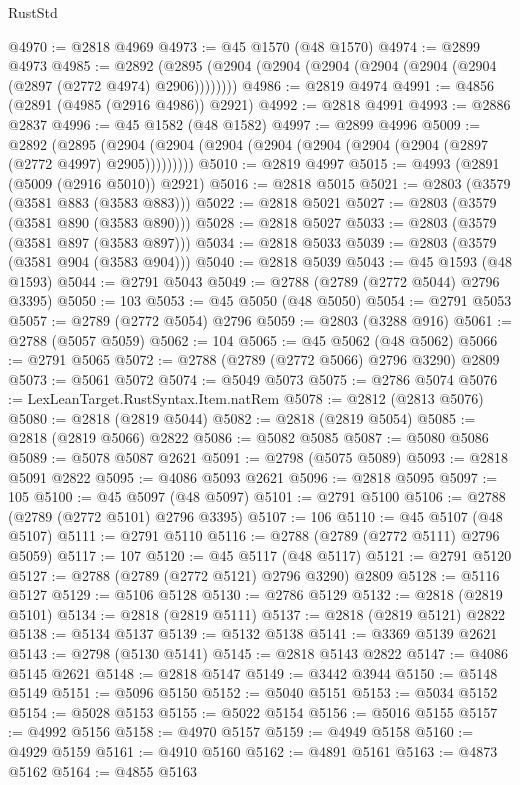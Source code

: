 \begin{lexlean}{RustStd}
\begin{coremodule}
@4970 := @2818 @4969
@4973 := @45 @1570 (@48 @1570)
@4974 := @2899 @4973
@4985 := @2892 (@2895 (@2904 (@2904 (@2904 (@2904 (@2904 (@2904 (@2897 (@2772 @4974) @2906))))))))
@4986 := @2819 @4974
@4991 := @4856 (@2891 (@4985 (@2916 @4986)) @2921)
@4992 := @2818 @4991
@4993 := @2886 @2837
@4996 := @45 @1582 (@48 @1582)
@4997 := @2899 @4996
@5009 := @2892
    (@2895 (@2904 (@2904 (@2904 (@2904 (@2904 (@2904 (@2904 (@2897 (@2772 @4997) @2905)))))))))
@5010 := @2819 @4997
@5015 := @4993 (@2891 (@5009 (@2916 @5010)) @2921)
@5016 := @2818 @5015
@5021 := @2803 (@3579 (@3581 @883 (@3583 @883)))
@5022 := @2818 @5021
@5027 := @2803 (@3579 (@3581 @890 (@3583 @890)))
@5028 := @2818 @5027
@5033 := @2803 (@3579 (@3581 @897 (@3583 @897)))
@5034 := @2818 @5033
@5039 := @2803 (@3579 (@3581 @904 (@3583 @904)))
@5040 := @2818 @5039
@5043 := @45 @1593 (@48 @1593)
@5044 := @2791 @5043
@5049 := @2788 (@2789 (@2772 @5044) @2796 @3395)
@5050 := 103
@5053 := @45 @5050 (@48 @5050)
@5054 := @2791 @5053
@5057 := @2789 (@2772 @5054) @2796
@5059 := @2803 (@3288 @916)
@5061 := @2788 (@5057 @5059)
@5062 := 104
@5065 := @45 @5062 (@48 @5062)
@5066 := @2791 @5065
@5072 := @2788 (@2789 (@2772 @5066) @2796 @3290) @2809
@5073 := @5061 @5072
@5074 := @5049 @5073
@5075 := @2786 @5074
@5076 := LexLeanTarget.RustSyntax.Item.natRem
@5078 := @2812 (@2813 @5076)
@5080 := @2818 (@2819 @5044)
@5082 := @2818 (@2819 @5054)
@5085 := @2818 (@2819 @5066) @2822
@5086 := @5082 @5085
@5087 := @5080 @5086
@5089 := @5078 @5087 @2621
@5091 := @2798 (@5075 @5089)
@5093 := @2818 @5091 @2822
@5095 := @4086 @5093 @2621
@5096 := @2818 @5095
@5097 := 105
@5100 := @45 @5097 (@48 @5097)
@5101 := @2791 @5100
@5106 := @2788 (@2789 (@2772 @5101) @2796 @3395)
@5107 := 106
@5110 := @45 @5107 (@48 @5107)
@5111 := @2791 @5110
@5116 := @2788 (@2789 (@2772 @5111) @2796 @5059)
@5117 := 107
@5120 := @45 @5117 (@48 @5117)
@5121 := @2791 @5120
@5127 := @2788 (@2789 (@2772 @5121) @2796 @3290) @2809
@5128 := @5116 @5127
@5129 := @5106 @5128
@5130 := @2786 @5129
@5132 := @2818 (@2819 @5101)
@5134 := @2818 (@2819 @5111)
@5137 := @2818 (@2819 @5121) @2822
@5138 := @5134 @5137
@5139 := @5132 @5138
@5141 := @3369 @5139 @2621
@5143 := @2798 (@5130 @5141)
@5145 := @2818 @5143 @2822
@5147 := @4086 @5145 @2621
@5148 := @2818 @5147
@5149 := @3442 @3944
@5150 := @5148 @5149
@5151 := @5096 @5150
@5152 := @5040 @5151
@5153 := @5034 @5152
@5154 := @5028 @5153
@5155 := @5022 @5154
@5156 := @5016 @5155
@5157 := @4992 @5156
@5158 := @4970 @5157
@5159 := @4949 @5158
@5160 := @4929 @5159
@5161 := @4910 @5160
@5162 := @4891 @5161
@5163 := @4873 @5162
@5164 := @4855 @5163

\end{coremodule}
\end{lexlean}

